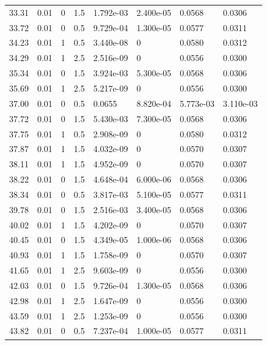 \documentclass[preview]{standalone}
\begin{document}
{{{\begin{tabular}{L{1.2cm}C{1.2cm} C{0.3cm}C{0.5cm} C{1.4cm}C{1.4cm} C{1.4cm}C{1.4cm}}
  33.31  &  0.01  & 0     & 1.5 &  1.792e-03  & 2.400e-05  & 0.0568 &  0.0306   \\ 
  33.72  &  0.01  & 0     & 0.5 &  9.729e-04  & 1.300e-05  & 0.0577 &  0.0311   \\ 
  34.23  &  0.01  & 1     & 0.5 &  3.440e-08  & 0  & 0.0580 &  0.0312   \\ 
  34.29  &  0.01  & 1     & 2.5 &  2.516e-09  & 0  & 0.0556 &  0.0300   \\ 
  35.34  &  0.01  & 0     & 1.5 &  3.924e-03  & 5.300e-05  & 0.0568 &  0.0306   \\ 
  35.69  &  0.01  & 1     & 2.5 &  5.217e-09  & 0  & 0.0556 &  0.0300   \\ 
  37.00  &  0.01  & 0     & 0.5 &  0.0655  & 8.820e-04  & 5.773e-03 &  3.110e-03   \\ 
  37.72  &  0.01  & 0     & 1.5 &  5.430e-03  & 7.300e-05  & 0.0568 &  0.0306   \\ 
  37.75  &  0.01  & 1     & 0.5 &  2.908e-09  & 0  & 0.0580 &  0.0312   \\ 
  37.87  &  0.01  & 1     & 1.5 &  4.032e-09  & 0  & 0.0570 &  0.0307   \\ 
  38.11  &  0.01  & 1     & 1.5 &  4.952e-09  & 0  & 0.0570 &  0.0307   \\ 
  38.22  &  0.01  & 0     & 1.5 &  4.648e-04  & 6.000e-06  & 0.0568 &  0.0306   \\ 
  38.34  &  0.01  & 0     & 0.5 &  3.817e-03  & 5.100e-05  & 0.0577 &  0.0311   \\ 
  39.78  &  0.01  & 0     & 1.5 &  2.516e-03  & 3.400e-05  & 0.0568 &  0.0306   \\ 
  40.02  &  0.01  & 1     & 1.5 &  4.202e-09  & 0  & 0.0570 &  0.0307   \\ 
  40.45  &  0.01  & 0     & 1.5 &  4.349e-05  & 1.000e-06  & 0.0568 &  0.0306   \\ 
  40.93  &  0.01  & 1     & 1.5 &  1.758e-09  & 0  & 0.0570 &  0.0307   \\ 
  41.65  &  0.01  & 1     & 2.5 &  9.603e-09  & 0  & 0.0556 &  0.0300   \\ 
  42.03  &  0.01  & 0     & 1.5 &  9.726e-04  & 1.300e-05  & 0.0568 &  0.0306   \\ 
  42.98  &  0.01  & 1     & 2.5 &  1.647e-09  & 0  & 0.0556 &  0.0300   \\ 
  43.59  &  0.01  & 1     & 2.5 &  1.253e-09  & 0  & 0.0556 &  0.0300   \\ 
  43.82  &  0.01  & 0     & 0.5 &  7.237e-04  & 1.000e-05  & 0.0577 &  0.0311   \\ 

\end{tabular}}}}
\end{document}
